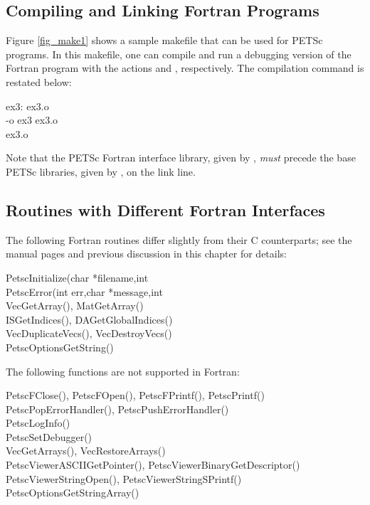 \subsection{Compiling and Linking Fortran Programs}
\label{sec_fortcompile}

Figure \ref{fig_make1} shows a sample makefile that can be used for
PETSc programs.  In this makefile, one can compile and run a debugging version
of the Fortran program  with the actions    and
 , respectively. The compilation command is restated below:
\begin{tabbing}
   ex3: ex3.o \\
    -o ex3 ex3.o   \\
    ex3.o
\end{tabbing}
Note that the PETSc Fortran interface library, given by 
, {\em must}   precede
the base PETSc libraries, given by , 
on the link line.

\subsection{Routines with Different Fortran Interfaces}
\label{sec_fortran_exceptions}

The following Fortran routines differ slightly from their C counterparts; see the 
manual pages and previous discussion in this chapter for details:
\begin{tabbing}
 PetscInitialize(char *filename,int \\
 PetscError(int err,char *message,int \\
 VecGetArray(), MatGetArray()\\
 ISGetIndices(), DAGetGlobalIndices()\\
 VecDuplicateVecs(), VecDestroyVecs()\\
 PetscOptionsGetString()
\end{tabbing}
The following functions are not supported in Fortran:
\begin{tabbing}
 PetscFClose(), PetscFOpen(), PetscFPrintf(), PetscPrintf()\\
 PetscPopErrorHandler(), PetscPushErrorHandler()\\
 PetscLogInfo()\\
 PetscSetDebugger()\\
 VecGetArrays(), VecRestoreArrays()\\
 PetscViewerASCIIGetPointer(), PetscViewerBinaryGetDescriptor()\\
 PetscViewerStringOpen(), PetscViewerStringSPrintf()\\
 PetscOptionsGetStringArray()
\end{tabbing}

